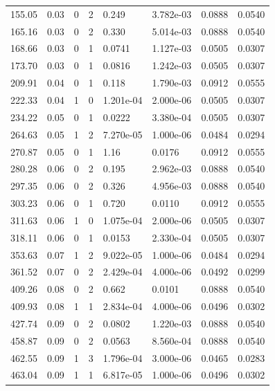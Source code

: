 \documentclass[preview]{standalone}
\begin{document}
{{\begin{tabular}{L{1.2cm}C{1.2cm} C{0.3cm}C{0.5cm} C{1.4cm}C{1.4cm} C{1.4cm}C{1.4cm}}
  155.05  &  0.03  & 0     &  2 &  0.249  & 3.782e-03  & 0.0888 &  0.0540   \\ 
  165.16  &  0.03  & 0     &  2 &  0.330  & 5.014e-03  & 0.0888 &  0.0540   \\ 
  168.66  &  0.03  & 0     &  1 &  0.0741  & 1.127e-03  & 0.0505 &  0.0307   \\ 
  173.70  &  0.03  & 0     &  1 &  0.0816  & 1.242e-03  & 0.0505 &  0.0307   \\ 
  209.91  &  0.04  & 0     &  1 &  0.118  & 1.790e-03  & 0.0912 &  0.0555   \\ 
  222.33  &  0.04  & 1     &  0 &  1.201e-04  & 2.000e-06  & 0.0505 &  0.0307   \\ 
  234.22  &  0.05  & 0     &  1 &  0.0222  & 3.380e-04  & 0.0505 &  0.0307   \\ 
  264.63  &  0.05  & 1     &  2 &  7.270e-05  & 1.000e-06  & 0.0484 &  0.0294   \\ 
  270.87  &  0.05  & 0     &  1 &  1.16  & 0.0176  & 0.0912 &  0.0555   \\ 
  280.28  &  0.06  & 0     &  2 &  0.195  & 2.962e-03  & 0.0888 &  0.0540   \\ 
  297.35  &  0.06  & 0     &  2 &  0.326  & 4.956e-03  & 0.0888 &  0.0540   \\ 
  303.23  &  0.06  & 0     &  1 &  0.720  & 0.0110  & 0.0912 &  0.0555   \\ 
  311.63  &  0.06  & 1     &  0 &  1.075e-04  & 2.000e-06  & 0.0505 &  0.0307   \\ 
  318.11  &  0.06  & 0     &  1 &  0.0153  & 2.330e-04  & 0.0505 &  0.0307   \\ 
  353.63  &  0.07  & 1     &  2 &  9.022e-05  & 1.000e-06  & 0.0484 &  0.0294   \\ 
  361.52  &  0.07  & 0     &  2 &  2.429e-04  & 4.000e-06  & 0.0492 &  0.0299   \\ 
  409.26  &  0.08  & 0     &  2 &  0.662  & 0.0101  & 0.0888 &  0.0540   \\ 
  409.93  &  0.08  & 1     &  1 &  2.834e-04  & 4.000e-06  & 0.0496 &  0.0302   \\ 
  427.74  &  0.09  & 0     &  2 &  0.0802  & 1.220e-03  & 0.0888 &  0.0540   \\ 
  458.87  &  0.09  & 0     &  2 &  0.0563  & 8.560e-04  & 0.0888 &  0.0540   \\ 
  462.55  &  0.09  & 1     &  3 &  1.796e-04  & 3.000e-06  & 0.0465 &  0.0283   \\ 
  463.04  &  0.09  & 1     &  1 &  6.817e-05  & 1.000e-06  & 0.0496 &  0.0302   \\ 

\end{tabular}}}
\end{document}
